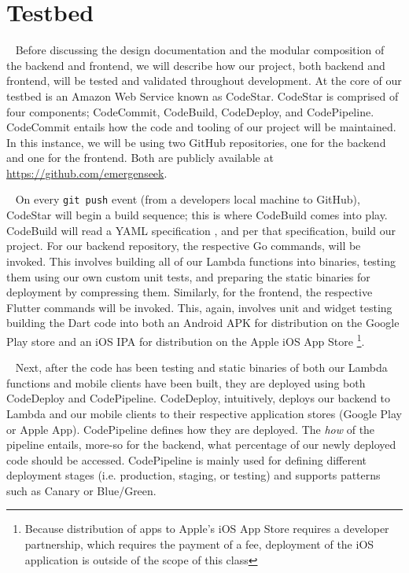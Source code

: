 \documentclass[10pt, a4paper]{article}
\begin{document}
\section{Testbed}
\par ~ Before discussing the design documentation and the modular composition of the backend and frontend, we will describe how our project, both backend and frontend, will be tested and validated throughout development. At the core of our testbed is an Amazon Web Service known as CodeStar. CodeStar is comprised of four components; CodeCommit, CodeBuild, CodeDeploy, and CodePipeline. CodeCommit entails how the code and tooling of our project will be maintained. In this instance, we will be using two GitHub repositories, one for the backend and one for the frontend. Both are publicly available at \url{https://github.com/emergenseek}. 

\par ~ On every \texttt{git push} event (from a developers local machine to GitHub), CodeStar will begin a build sequence; this is where CodeBuild comes into play. CodeBuild will read a YAML specification \cite{two}, and per that specification, build our project. For our backend repository, the respective Go commands, will be invoked. This involves building all of our Lambda functions into binaries, testing them using our own custom unit tests, and preparing the static binaries for deployment by compressing them. Similarly, for the frontend, the respective Flutter commands will be invoked. This, again, involves unit and widget testing \cite{three} building the Dart code into both an Android APK \cite{four} for distribution on the Google Play store and an iOS IPA for distribution on the Apple iOS App Store \footnote{Because distribution of apps to Apple's iOS App Store requires a developer partnership, which requires the payment of a fee, deployment of the iOS application is outside of the scope of this class}.

\par ~ Next, after the code has been testing and static binaries of both our Lambda functions and mobile clients have been built, they are deployed using both CodeDeploy and CodePipeline. CodeDeploy, intuitively, deploys our backend to Lambda and our mobile clients to their respective application stores (Google Play or Apple App). CodePipeline defines how they are deployed. The \emph{how} of the pipeline entails, more-so for the backend, what percentage of our newly deployed code should be accessed. CodePipeline is mainly used for defining different deployment stages (i.e. production, staging, or testing) and supports patterns such as Canary or Blue/Green. 
\end{document}
